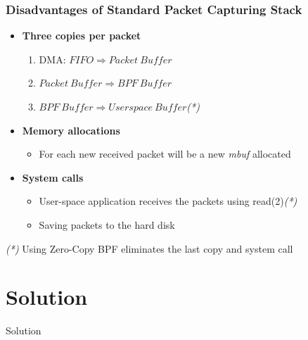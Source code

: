 \documentclass{beamer}
\begin{document}
\begin{frame}
\frametitle{Disadvantages of Standard Packet Capturing Stack}
\begin{itemize}
	\item \textbf{Three copies per packet}
		\begin{enumerate}
			\item DMA: $FIFO \Rightarrow Packet\ Buffer$
			\item $Packet\ Buffer \Rightarrow BPF\ Buffer$
			\item $BPF\ Buffer \Rightarrow Userspace\ Buffer$\emph{(*)}
		\end{enumerate}
	\item \textbf{Memory allocations }
		\begin{itemize}
			\item For each new received packet will be a new \emph{mbuf} 
				allocated
		\end{itemize}
	\item \textbf{System calls }
		\begin{itemize}
			\item User-space application receives the packets using read(2)\emph{(*)}
			\item Saving packets to the hard disk
		\end{itemize}
\end{itemize}
\begin{tiny}
\emph{(*)} Using Zero-Copy BPF eliminates the last copy and system call
\end{tiny}
\end{frame}

\section{Solution}

\begin{frame}
	\begin{center}
	\huge{Solution}
	\end{center}
\end{frame}
\end{document}
